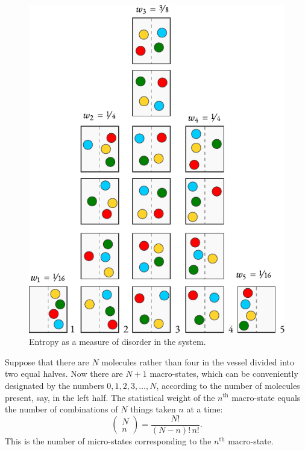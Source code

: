 \begin{figure}[!ht]
 \centering
 \includegraphics[width=0.7\tfwidth]{figures/macro-state-1.pdf}
\caption{Entropy as a measure of disorder in the system.\label{entropy-disorder}}
 \end{figure}
 
Suppose that there are $N$ molecules rather than four in the vessel divided into two equal halves. Now there are $N + 1$ macro-states, which can	 be	conveniently designated	by	the	numbers	$0, 1,2, 3, \ldots , N$, according to the number of molecules present, say, in the left half. The statistical weight of the $n^{\text{th}}$ macro-state equals the number of combinations of $N$ things taken $n$ at a time:
\begin{equation}%
\begin{pmatrix}
N\\ n
\end{pmatrix}= \frac{N!}{(N-n)! \,n!}.
\label{eq-4.54}
\end{equation}
This is the number of micro-states corresponding to the $n^{\text{th}}$ macro-state.

